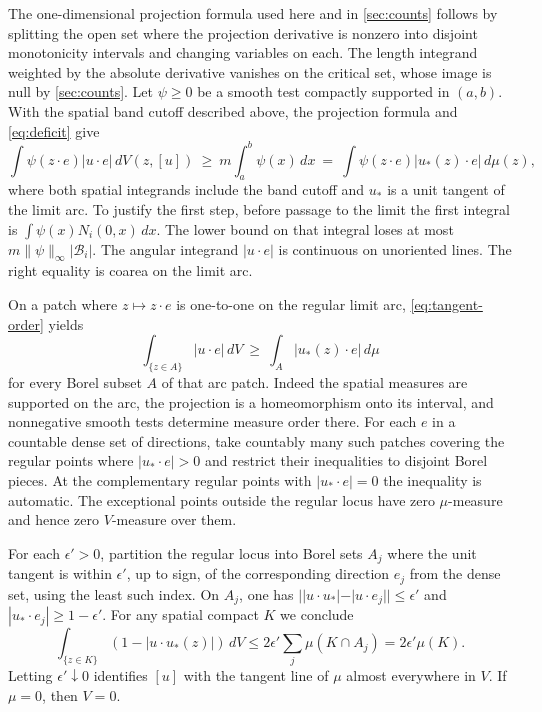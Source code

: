 The one-dimensional projection formula used here and in \cref{sec:counts} follows by splitting the open set where the projection derivative is nonzero into disjoint monotonicity intervals and changing variables on each. The length integrand weighted by the absolute derivative vanishes on the critical set, whose image is null by \cref{sec:counts}. Let \(\psi\ge0\) be a smooth test compactly supported in \((a,b)\). With the spatial band cutoff described above, the projection formula and \eqref{eq:deficit} give \begin{equation}\label{eq:tangent-order}
\int \psi(z\cdot e)|u\cdot e|\,dV(z,[u])
\ \ge\ m\int_a^b\psi(x)\,dx
\ =\ \int \psi(z\cdot e)|u_*(z)\cdot e|\,d\mu(z),
\end{equation} where both spatial integrands include the band cutoff and \(u_*\) is a unit tangent of the limit arc. To justify the first step, before passage to the limit the first integral is \(\int\psi(x)N_i(0,x)\,dx\). The lower bound on that integral loses at most \(m\|\psi\|_\infty|\mathcal B_i|\). The angular integrand \(|u\cdot e|\) is continuous on unoriented lines. The right equality is coarea on the limit arc.

On a patch where \(z\mapsto z\cdot e\) is one-to-one on the regular limit arc, \eqref{eq:tangent-order} yields \[
\int_{\{z\in A\}}|u\cdot e|\,dV\ \ge\ \int_A|u_*(z)\cdot e|\,d\mu
\] for every Borel subset \(A\) of that arc patch. Indeed the spatial measures are supported on the arc, the projection is a homeomorphism onto its interval, and nonnegative smooth tests determine measure order there. For each \(e\) in a countable dense set of directions, take countably many such patches covering the regular points where \(|u_*\cdot e|>0\) and restrict their inequalities to disjoint Borel pieces. At the complementary regular points with \(|u_*\cdot e|=0\) the inequality is automatic. The exceptional points outside the regular locus have zero \(\mu\)-measure and hence zero \(V\)-measure over them.

For each \(\epsilon'>0\), partition the regular locus into Borel sets \(A_j\) where the unit tangent is within \(\epsilon'\), up to sign, of the corresponding direction \(e_j\) from the dense set, using the least such index. On \(A_j\), one has \(||u\cdot u_*|-|u\cdot e_j||\le\epsilon'\) and \(|u_*\cdot e_j|\ge1-\epsilon'\). For any spatial compact \(K\) we conclude \[
\int_{\{z\in K\}}(1-|u\cdot u_*(z)|)\,dV\le 2\epsilon'\sum_j\mu(K\cap A_j)=2\epsilon'\mu(K).
\] Letting \(\epsilon'\downarrow0\) identifies \([u]\) with the tangent line of \(\mu\) almost everywhere in \(V\). If \(\mu=0\), then \(V=0\).


